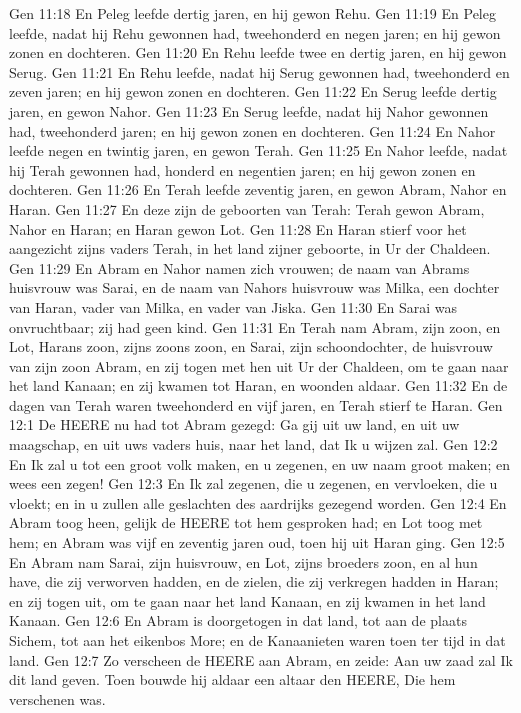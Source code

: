 Gen 11:18  En Peleg leefde dertig jaren, en hij gewon Rehu.
Gen 11:19  En Peleg leefde, nadat hij Rehu gewonnen had, tweehonderd en negen jaren; en hij gewon zonen en dochteren.
Gen 11:20  En Rehu leefde twee en dertig jaren, en hij gewon Serug.
Gen 11:21  En Rehu leefde, nadat hij Serug gewonnen had, tweehonderd en zeven jaren; en hij gewon zonen en dochteren.
Gen 11:22  En Serug leefde dertig jaren, en gewon Nahor.
Gen 11:23  En Serug leefde, nadat hij Nahor gewonnen had, tweehonderd jaren; en hij gewon zonen en dochteren.
Gen 11:24  En Nahor leefde negen en twintig jaren, en gewon Terah.
Gen 11:25  En Nahor leefde, nadat hij Terah gewonnen had, honderd en negentien jaren; en hij gewon zonen en dochteren.
Gen 11:26  En Terah leefde zeventig jaren, en gewon Abram, Nahor en Haran.
Gen 11:27  En deze zijn de geboorten van Terah: Terah gewon Abram, Nahor en Haran; en Haran gewon Lot.
Gen 11:28  En Haran stierf voor het aangezicht zijns vaders Terah, in het land zijner geboorte, in Ur der Chaldeen.
Gen 11:29  En Abram en Nahor namen zich vrouwen; de naam van Abrams huisvrouw was Sarai, en de naam van Nahors huisvrouw was Milka, een dochter van Haran, vader van Milka, en vader van Jiska.
Gen 11:30  En Sarai was onvruchtbaar; zij had geen kind.
Gen 11:31  En Terah nam Abram, zijn zoon, en Lot, Harans zoon, zijns zoons zoon, en Sarai, zijn schoondochter, de huisvrouw van zijn zoon Abram, en zij togen met hen uit Ur der Chaldeen, om te gaan naar het land Kanaan; en zij kwamen tot Haran, en woonden aldaar.
Gen 11:32  En de dagen van Terah waren tweehonderd en vijf jaren, en Terah stierf te Haran.
Gen 12:1  De HEERE nu had tot Abram gezegd: Ga gij uit uw land, en uit uw maagschap, en uit uws vaders huis, naar het land, dat Ik u wijzen zal.
Gen 12:2  En Ik zal u tot een groot volk maken, en u zegenen, en uw naam groot maken; en wees een zegen!
Gen 12:3  En Ik zal zegenen, die u zegenen, en vervloeken, die u vloekt; en in u zullen alle geslachten des aardrijks gezegend worden.
Gen 12:4  En Abram toog heen, gelijk de HEERE tot hem gesproken had; en Lot toog met hem; en Abram was vijf en zeventig jaren oud, toen hij uit Haran ging.
Gen 12:5  En Abram nam Sarai, zijn huisvrouw, en Lot, zijns broeders zoon, en al hun have, die zij verworven hadden, en de zielen, die zij verkregen hadden in Haran; en zij togen uit, om te gaan naar het land Kanaan, en zij kwamen in het land Kanaan.
Gen 12:6  En Abram is doorgetogen in dat land, tot aan de plaats Sichem, tot aan het eikenbos More; en de Kanaanieten waren toen ter tijd in dat land.
Gen 12:7  Zo verscheen de HEERE aan Abram, en zeide: Aan uw zaad zal Ik dit land geven. Toen bouwde hij aldaar een altaar den HEERE, Die hem verschenen was.
